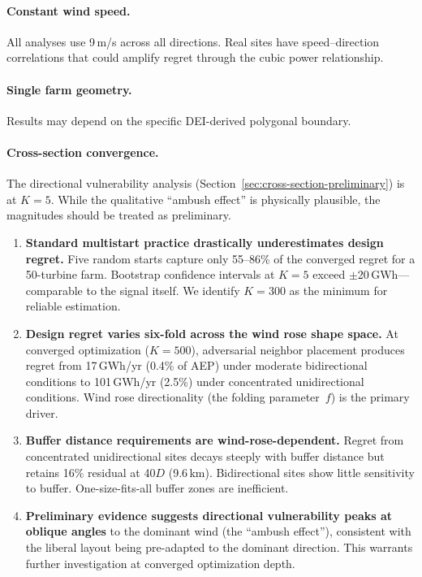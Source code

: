 \documentclass[manuscript, 12pt]{copernicus}
\begin{document}
\paragraph{Constant wind speed.} All analyses use 9\,m/s across all directions.
Real sites have speed--direction correlations that could amplify regret through the cubic power relationship.

\paragraph{Single farm geometry.} Results may depend on the specific DEI-derived polygonal boundary.

\paragraph{Cross-section convergence.} The directional vulnerability analysis (Section~\ref{sec:cross-section-preliminary}) is at $K = 5$.
While the qualitative ``ambush effect'' is physically plausible, the magnitudes should be treated as preliminary.

\conclusions

\begin{enumerate}
    \item \textbf{Standard multistart practice drastically underestimates design regret.}
    Five random starts capture only 55--86\% of the converged regret for a 50-turbine farm.
    Bootstrap confidence intervals at $K = 5$ exceed $\pm$20\,GWh---comparable to the signal itself.
    We identify $K = 300$ as the minimum for reliable estimation.

    \item \textbf{Design regret varies six-fold across the wind rose shape space.}
    At converged optimization ($K = 500$), adversarial neighbor placement produces regret from 17\,GWh/yr (0.4\% of AEP) under moderate bidirectional conditions to 101\,GWh/yr (2.5\%) under concentrated unidirectional conditions.
    Wind rose directionality (the folding parameter~$f$) is the primary driver.

    \item \textbf{Buffer distance requirements are wind-rose-dependent.}
    Regret from concentrated unidirectional sites decays steeply with buffer distance but retains 16\% residual at 40$D$ (9.6\,km).
    Bidirectional sites show little sensitivity to buffer.
    One-size-fits-all buffer zones are inefficient.

    \item \textbf{Preliminary evidence suggests directional vulnerability peaks at oblique angles} to the dominant wind (the ``ambush effect''), consistent with the liberal layout being pre-adapted to the dominant direction.
    This warrants further investigation at converged optimization depth.
\end{enumerate}
\end{document}
